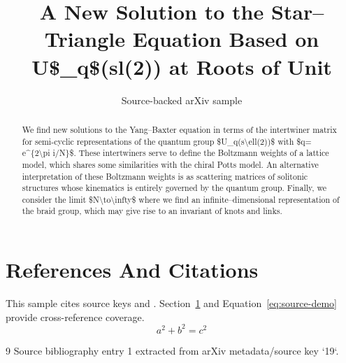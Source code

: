 \documentclass[11pt]{article}
\title{A New Solution to the Star--Triangle Equation Based on U\$\_q\$(sl(2)) at
  Roots of Unit}
\author{Source-backed arXiv sample}
\date{}
\begin{document}
\maketitle
\begin{abstract}
We find new solutions to the Yang--Baxter equation in terms of the intertwiner matrix for semi-cyclic representations of the quantum group \$U\_q(s\textbackslash{}ell(2))\$ with \$q= e\textasciicircum{}\{2\textbackslash{}pi i/N\}\$. These intertwiners serve to define the Boltzmann weights of a lattice model, which shares some similarities with the chiral Potts model. An alternative interpretation of these Boltzmann weights is as scattering matrices of solitonic structures whose kinematics is entirely governed by the quantum group. Finally, we consider the limit \$N\textbackslash{}to\textbackslash{}infty\$ where we find an infinite--dimensional representation of the braid group, which may give rise to an invariant of knots and links.
\end{abstract}
\section{References And Citations}
\label{sec:refs}
This sample cites source keys \cite{19} and \cite{19}. Section~\ref{sec:refs} and Equation~\ref{eq:source-demo} provide cross-reference coverage.
\begin{equation}
\label{eq:source-demo}
a^2 + b^2 = c^2
\end{equation}
\begin{thebibliography}{9}
 Source bibliography entry 1 extracted from arXiv metadata/source key `19`.
\end{thebibliography}
\end{document}
